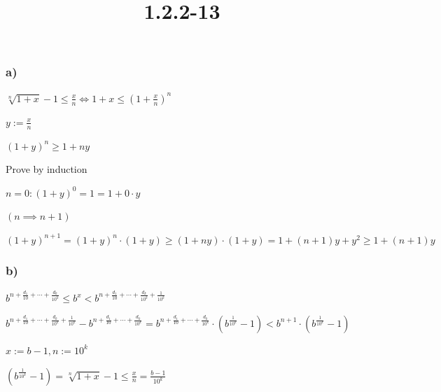 \documentclass{article}
\title{1.2.2-13}
\begin{document}
\maketitle

\subsubsection*{a)}

$\sqrt[n]{1+x} - 1 \leq \frac{x}{n} \iff 1+x \leq (1+\frac{x}{n})^n$

$y := \frac{x}{n}$

$(1+y)^n \geq 1 + ny$

Prove by induction

$n = 0: (1+y)^0=1=1+0\cdot y$

$(n \implies n + 1)$

$(1+y)^{n+1} = (1+y)^n \cdot (1+y) \geq (1+ny)\cdot(1+y)=1+(n+1)y+y^2 \geq 1+(n+1)y$

\subsubsection*{b)}

$b^{n+\frac{d_1}{10}+\cdots+\frac{d_k}{10^k}} \leq b^x < b^{n+\frac{d_1}{10}+\cdots+\frac{d_k}{10^k} + \frac{1}{10^k}}$

$b^{n+\frac{d_1}{10}+\cdots+\frac{d_k}{10^k} + \frac{1}{10^k}} - b^{n+\frac{d_1}{10}+\cdots+\frac{d_k}{10^k}} = b^{n+\frac{d_1}{10}+\cdots+\frac{d_k}{10^k}} \cdot (b^{\frac{1}{10^k}} - 1) < b^{n+1} \cdot (b^{\frac{1}{10^k}} - 1)$

$x := b - 1, n := 10^k$

$(b^{\frac{1}{10^k}} - 1) = \sqrt[n]{1+x} - 1 \leq \frac{x}{n} = \frac{b-1}{10^k}$
\end{document}
